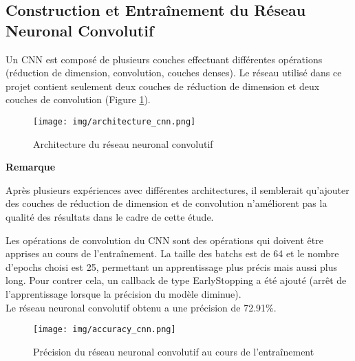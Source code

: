 \subsection{Construction et Entraînement du Réseau Neuronal Convolutif}
Un CNN est composé de plusieurs couches effectuant différentes opérations (réduction de dimension, convolution, couches denses). Le réseau utilisé dans ce projet contient seulement deux couches de réduction de dimension et deux couches de convolution (Figure \ref{architecture_cnn}).

\begin{figure}
    \center
    \texttt{[image: img/architecture\_cnn.png]}
    \caption{Architecture du réseau neuronal convolutif}
    \label{architecture_cnn}
\end{figure}

\noindent
\begin{minipage}[!hc]{0.12\textwidth}
   \textbf{Remarque}
\end{minipage}
\vrule\enskip\vrule\quad\begin{minipage}{\dimexpr 0.87\textwidth-0.8pt-1.5em}
Après plusieurs expériences avec différentes architectures, il semblerait qu'ajouter des couches de réduction de dimension et de convolution n'améliorent pas la qualité des résultats dans le cadre de cette étude.
\end{minipage}

Les opérations de convolution du CNN sont des opérations qui doivent être apprises au cours de l'entraînement. \cite{convolution} La taille des batchs est de 64 et le nombre d'epochs choisi est 25, permettant un apprentissage plus précis mais aussi plus long. Pour contrer cela, un callback de type \textsf{EarlyStopping} a été ajouté (arrêt de l'apprentissage lorsque la précision du modèle diminue).\\
Le réseau neuronal convolutif obtenu a une précision de 72.91\%.

\begin{figure}
    \center
    \texttt{[image: img/accuracy\_cnn.png]}
    \caption{Précision du réseau neuronal convolutif au cours de l'entraînement}
    \label{accuracy_cnn}
\end{figure}




